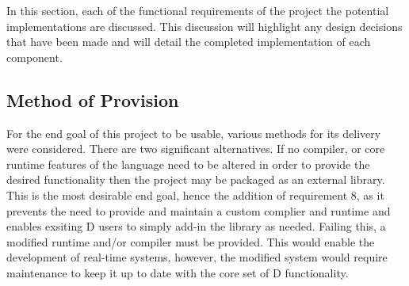 In this section, each of the functional requirements of the project the potential
implementations are discussed. This discussion will highlight any design 
decisions that have been made and will detail the completed implementation of 
each component. 

\subsection{Method of Provision}
For the end goal of this project to be usable, various methods for its delivery 
were considered. There are two significant alternatives. If no compiler, or 
core runtime features of the language need to be altered in order to provide the 
desired functionality then the project may be packaged as an external library. 
This is the most desirable end goal, hence the addition of requirement 8, as it 
prevents the need to provide and maintain a custom complier and runtime and enables 
exsiting D users to simply add-in the library as needed. 
Failing this, a modified runtime and/or compiler must be provided. This would 
enable the development of real-time systems, however, the modified system would 
require maintenance to keep it up to date with the core set of D functionality. 

